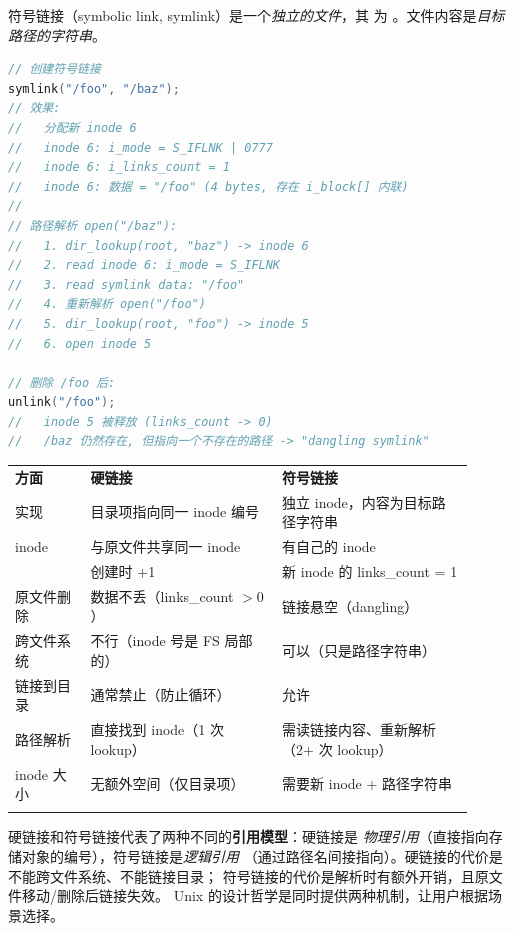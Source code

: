 \begin{filesystemlayout}

符号链接（symbolic link, symlink）是一个\emph{独立的文件}，其
 为 。文件内容是\emph{目标路径的字符串}。

\begin{lstlisting}[language=C]
// 创建符号链接
symlink("/foo", "/baz");
// 效果:
//   分配新 inode 6
//   inode 6: i_mode = S_IFLNK | 0777
//   inode 6: i_links_count = 1
//   inode 6: 数据 = "/foo" (4 bytes, 存在 i_block[] 内联)
//
// 路径解析 open("/baz"):
//   1. dir_lookup(root, "baz") -> inode 6
//   2. read inode 6: i_mode = S_IFLNK
//   3. read symlink data: "/foo"
//   4. 重新解析 open("/foo")
//   5. dir_lookup(root, "foo") -> inode 5
//   6. open inode 5

// 删除 /foo 后:
unlink("/foo");
//   inode 5 被释放 (links_count -> 0)
//   /baz 仍然存在, 但指向一个不存在的路径 -> "dangling symlink"
\end{lstlisting}


\begin{longtable}{|F{0.15\linewidth}|F{0.38\linewidth}|F{0.38\linewidth}|}
\hline
{}
\textbf{方面} & \textbf{硬链接} & \textbf{符号链接} \\\tablerowrule
\endhead
实现 & 目录项指向同一 inode 编号 & 独立 inode，内容为目标路径字符串 \\\tablerowrule
inode & 与原文件共享同一 inode & 有自己的 inode \\\tablerowrule
{} & 创建时 +1 & 新 inode 的 links\_count = 1 \\\tablerowrule
原文件删除 & 数据不丢（links\_count $> 0$） & 链接悬空（dangling） \\\tablerowrule
跨文件系统 & 不行（inode 号是 FS 局部的） & 可以（只是路径字符串） \\\tablerowrule
链接到目录 & 通常禁止（防止循环） & 允许 \\\tablerowrule
路径解析 & 直接找到 inode（1 次 lookup） & 需读链接内容、重新解析（2+ 次 lookup） \\\tablerowrule
 inode 大小 & 无额外空间（仅目录项） & 需要新 inode + 路径字符串 \\\tablerowrule
\end{longtable}

\begin{keyidea}
硬链接和符号链接代表了两种不同的\textbf{引用模型}：硬链接是
\emph{物理引用}（直接指向存储对象的编号），符号链接是\emph{逻辑引用}
（通过路径名间接指向）。硬链接的代价是不能跨文件系统、不能链接目录；
符号链接的代价是解析时有额外开销，且原文件移动/删除后链接失效。
Unix 的设计哲学是同时提供两种机制，让用户根据场景选择。
\end{keyidea}


\end{filesystemlayout}
